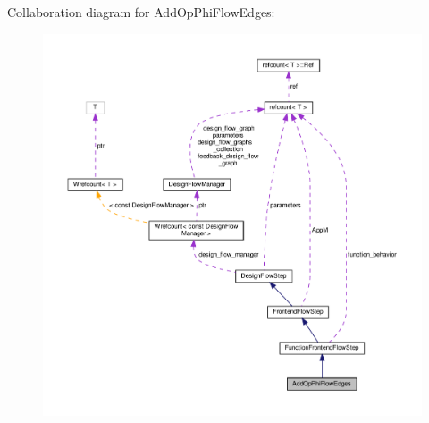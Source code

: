 Collaboration diagram for Add\+Op\+Phi\+Flow\+Edges\+:
\nopagebreak
\begin{figure}[H]
\begin{center}
\leavevmode
\includegraphics[width=350pt]{dc/d72/classAddOpPhiFlowEdges__coll__graph}
\end{center}
\end{figure}
